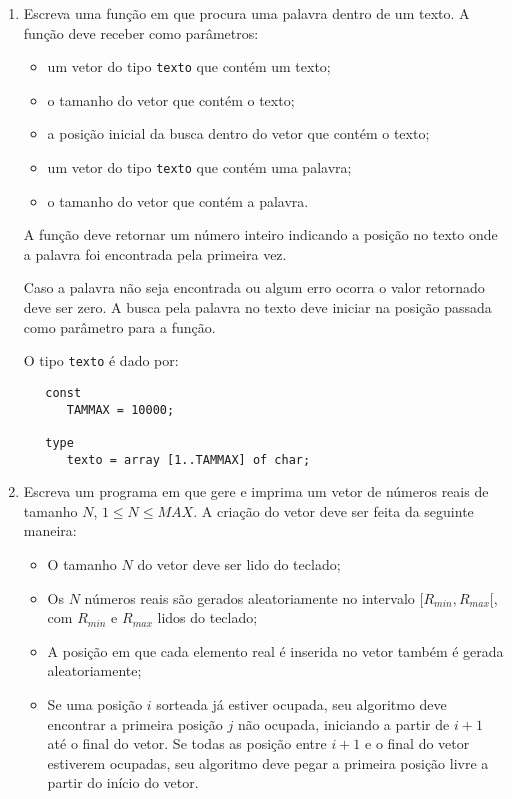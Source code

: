 \begin{enumerate}
\item Escreva uma função em  que procura uma palavra dentro
de um texto. A função deve receber como parâmetros:
\begin{itemize}
\item um vetor do tipo \verb+texto+ que contém um texto;
\item o tamanho do vetor que contém o texto;
\item a posição inicial da busca dentro do vetor que contém o 
texto;
\item um vetor do tipo \verb+texto+ que contém uma palavra;
\item o tamanho do vetor que contém a palavra.
\end{itemize}
A função deve retornar um número inteiro indicando a posição
no texto onde a palavra foi encontrada pela primeira vez. 

Caso a palavra não seja encontrada ou algum erro ocorra o 
valor retornado deve ser zero. A busca pela palavra no texto 
deve iniciar na posição passada como parâmetro para a função.

O tipo \verb+texto+ é dado por:
\begin{center}
\begin{small}
\begin{verbatim}
   const
      TAMMAX = 10000;

   type
      texto = array [1..TAMMAX] of char;

\end{verbatim}
\end{small}
\end{center}

\item Escreva um programa em  que gere e imprima um
vetor de números reais de tamanho $N$, $1 \le N \le MAX$. A criação
do vetor deve ser feita da seguinte maneira:
\begin{itemize}
\item O tamanho $N$ do vetor deve ser lido do teclado; 
\item Os $N$ números reais são gerados aleatoriamente no
intervalo $[R_{min},R_{max}[$, com $R_{min}$ e $R_{max}$ lidos do teclado;
\item A posição em que cada elemento real é inserida no vetor também é gerada
      aleatoriamente;
\item Se uma posição $i$ sorteada já estiver ocupada, seu algoritmo deve
encontrar a primeira posição $j$ não ocupada, iniciando a partir de $i+1$ até
o final do vetor. Se todas as posição entre $i+1$ e o final do vetor
estiverem ocupadas, seu algoritmo deve pegar a primeira posição livre a
partir do início do vetor.
\end{itemize}


\end{enumerate}
